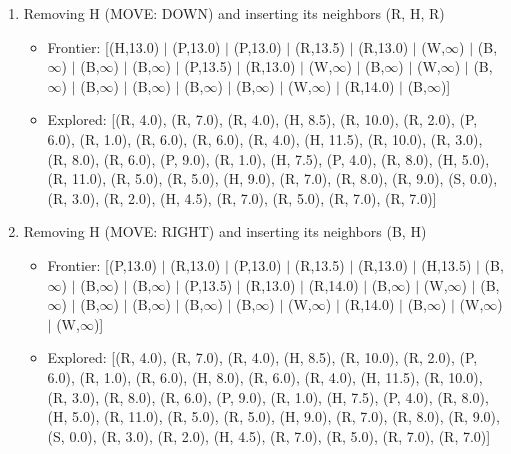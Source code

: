 \documentclass[12pt]{article}
\begin{document}
\begin{enumerate}
\item Removing H (MOVE: DOWN) and inserting its neighbors (R, H, R)
\begin{itemize}
\item Frontier: [(H,13.0) \(|\) (P,13.0) \(|\) (P,13.0) \(|\) (R,13.5) \(|\) (R,13.0) \(|\) (W,\(\infty\)) \(|\) (B,\(\infty\)) \(|\) (B,\(\infty\)) \(|\) (B,\(\infty\)) \(|\) (P,13.5) \(|\) (R,13.0) \(|\) (W,\(\infty\)) \(|\) (B,\(\infty\)) \(|\) (W,\(\infty\)) \(|\) (B,\(\infty\)) \(|\) (B,\(\infty\)) \(|\) (B,\(\infty\)) \(|\) (B,\(\infty\)) \(|\) (B,\(\infty\)) \(|\) (W,\(\infty\)) \(|\) (R,14.0) \(|\) (B,\(\infty\))]
\item Explored: [(R, 4.0), (R, 7.0), (R, 4.0), (H, 8.5), (R, 10.0), (R, 2.0), (P, 6.0), (R, 1.0), (R, 6.0), (R, 6.0), (R, 4.0), (H, 11.5), (R, 10.0), (R, 3.0), (R, 8.0), (R, 6.0), (P, 9.0), (R, 1.0), (H, 7.5), (P, 4.0), (R, 8.0), (H, 5.0), (R, 11.0), (R, 5.0), (R, 5.0), (H, 9.0), (R, 7.0), (R, 8.0), (R, 9.0), (S, 0.0), (R, 3.0), (R, 2.0), (H, 4.5), (R, 7.0), (R, 5.0), (R, 7.0), (R, 7.0)]
\end{itemize}

\item Removing H (MOVE: RIGHT) and inserting its neighbors (B, H)
\begin{itemize}
\item Frontier: [(P,13.0) \(|\) (R,13.0) \(|\) (P,13.0) \(|\) (R,13.5) \(|\) (R,13.0) \(|\) (H,13.5) \(|\) (B,\(\infty\)) \(|\) (B,\(\infty\)) \(|\) (B,\(\infty\)) \(|\) (P,13.5) \(|\) (R,13.0) \(|\) (R,14.0) \(|\) (B,\(\infty\)) \(|\) (W,\(\infty\)) \(|\) (B,\(\infty\)) \(|\) (B,\(\infty\)) \(|\) (B,\(\infty\)) \(|\) (B,\(\infty\)) \(|\) (B,\(\infty\)) \(|\) (W,\(\infty\)) \(|\) (R,14.0) \(|\) (B,\(\infty\)) \(|\) (W,\(\infty\)) \(|\) (W,\(\infty\))]
\item Explored: [(R, 4.0), (R, 7.0), (R, 4.0), (H, 8.5), (R, 10.0), (R, 2.0), (P, 6.0), (R, 1.0), (R, 6.0), (H, 8.0), (R, 6.0), (R, 4.0), (H, 11.5), (R, 10.0), (R, 3.0), (R, 8.0), (R, 6.0), (P, 9.0), (R, 1.0), (H, 7.5), (P, 4.0), (R, 8.0), (H, 5.0), (R, 11.0), (R, 5.0), (R, 5.0), (H, 9.0), (R, 7.0), (R, 8.0), (R, 9.0), (S, 0.0), (R, 3.0), (R, 2.0), (H, 4.5), (R, 7.0), (R, 5.0), (R, 7.0), (R, 7.0)]
\end{itemize}


\end{enumerate}
\end{document}
